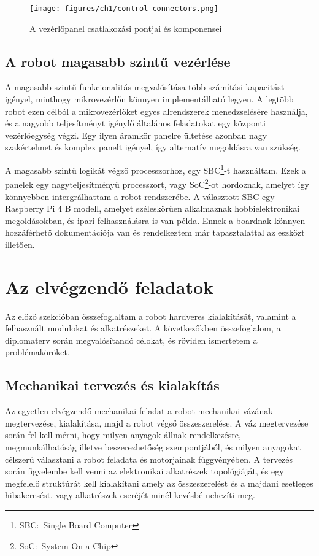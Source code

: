 \begin{figure}
  \centering \texttt{[image: figures/ch1/control-connectors.png]}
  \caption{A vezérlőpanel csatlakozási pontjai és komponensei}
  \label{fig:ctrl_connectors}
\end{figure}

\subsection{A robot magasabb szintű vezérlése}
A magasabb szintű funkcionalitás megvalósítása több számítási kapacitást igényel,
minthogy mikrovezérlőn könnyen implementálható legyen. A legtöbb robot ezen
célból a mikrovezérlőket egyes alrendszerek menedzselésére használja, és a
nagyobb teljesítményt igénylő általános feladatokat egy központi vezérlőegység
végzi. Egy ilyen áramkör panelre ültetése azonban nagy szakértelmet és komplex
panelt igényel, így alternatív megoldásra van szükség.

A magasabb szintű logikát végző processzorhoz, egy SBC\footnote{SBC:~Single Board
Computer}-t használtam. Ezek a panelek egy nagyteljesítményű processzort, vagy
SoC\footnote{SoC:~System On a Chip}-ot hordoznak, amelyet így könnyebben
intergrálhattam a robot rendszerébe. A választott SBC egy Raspberry Pi 4 B
modell, amelyet széleskörűen alkalmaznak hobbielektronikai megoldásokban, és
ipari felhasználásra is van példa. Ennek a boardnak könnyen hozzáférhető
dokumentációja van és rendelkeztem már tapasztalattal az eszközt illetően.

\section{Az elvégzendő feladatok}

Az előző szekcióban összefoglaltam a robot hardveres kialakítását, valamint a
felhasznált modulokat és alkatrészeket. A következőkben összefoglalom, a
diplomaterv során megvalósítandó célokat, és röviden ismertetem a
problémaköröket.

\subsection{Mechanikai tervezés és kialakítás}

Az egyetlen elvégzendő mechanikai feladat a robot mechanikai vázának
megtervezése, kialakítása, majd a robot végső összeszerelése. A váz megtervezése
során fel kell mérni, hogy milyen anyagok állnak rendelkezésre, megmunkálhatóság
illetve beszerezhetőség szempontjából, és milyen anyagokat célszerű választani a
robot feladata és motorjainak függvényében. A tervezés során figyelembe kell
venni az elektronikai alkatrészek topológiáját, és egy megfelelő struktúrát kell
kialakítani amely az összeszerelést és a majdani esetleges hibakeresést, vagy
alkatrészek cseréjét minél kevésbé nehezíti meg.

